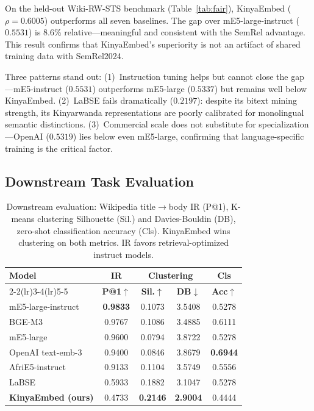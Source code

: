 \documentclass[letterpaper]{article} %
\begin{document}
On the held-out Wiki-RW-STS benchmark (Table~\ref{tab:fair}), KinyaEmbed
($\rho = 0.6005$) outperforms all seven baselines. The gap over
mE5-large-instruct ($0.5531$) is 8.6\% relative---meaningful and consistent
with the SemRel advantage. This result confirms that KinyaEmbed's superiority
is not an artifact of shared training data with SemRel2024.

Three patterns stand out: (1)~Instruction tuning helps but cannot close the
gap---mE5-instruct ($0.5531$) outperforms mE5-large ($0.5337$) but remains
well below KinyaEmbed. (2)~LaBSE fails dramatically ($0.2197$): despite
its bitext mining strength, its Kinyarwanda representations are poorly
calibrated for monolingual semantic distinctions. (3)~Commercial scale does
not substitute for specialization---OpenAI ($0.5319$) lies below even
mE5-large, confirming that language-specific training is the critical factor.

\subsection{Downstream Task Evaluation}

\begin{table}[t]
\centering
\small
\setlength{\tabcolsep}{3pt}
\begin{tabular}{lcccc}
\toprule
\multirow{2}{*}{\textbf{Model}} & \textbf{IR} & \multicolumn{2}{c}{\textbf{Clustering}} & \textbf{Cls} \\
\cmidrule(lr){2-2}\cmidrule(lr){3-4}\cmidrule(lr){5-5}
                       & \textbf{P@1}$\uparrow$ & \textbf{Sil.}$\uparrow$ & \textbf{DB}$\downarrow$ & \textbf{Acc}$\uparrow$ \\
\midrule
mE5-large-instruct     & \textbf{0.9833} & 0.1073 & 3.5408 & 0.5278 \\
BGE-M3                 & 0.9767 & 0.1086 & 3.4885 & 0.6111 \\
mE5-large              & 0.9600 & 0.0794 & 3.8722 & 0.5278 \\
OpenAI text-emb-3      & 0.9400 & 0.0846 & 3.8679 & \textbf{0.6944} \\
AfriE5-instruct        & 0.9133 & 0.1104 & 3.5749 & 0.5556 \\
LaBSE                  & 0.5933 & 0.1882 & 3.1047 & 0.5278 \\
\midrule
\textbf{KinyaEmbed (ours)} & 0.4733 & \textbf{0.2146} & \textbf{2.9004} & 0.4444 \\
\bottomrule
\end{tabular}
\caption{Downstream evaluation: Wikipedia title$\to$body IR (P@1), K-means
clustering Silhouette (Sil.) and Davies-Bouldin (DB), zero-shot
classification accuracy (Cls). KinyaEmbed wins clustering on both metrics.
IR favors retrieval-optimized instruct models.}
\label{tab:downstream}
\end{table}
\end{document}

